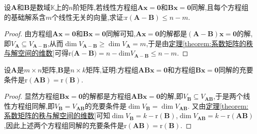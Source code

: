 \documentclass[../../main.tex]{subfiles}%
\begin{document}
\begin{example}
设\(\boldsymbol{A}\)和\(\boldsymbol{B}\)是数域\(\mathbb{K}\)上的\(n\)阶矩阵,若线性方程组\(\boldsymbol{A}\boldsymbol{x}=\boldsymbol{0}\)和\(\boldsymbol{B}\boldsymbol{x}=\boldsymbol{0}\)同解,且每个方程组的基础解系含\(m\)个线性无关的向量,求证:\(\mathrm{r}(\boldsymbol{A}-\boldsymbol{B})\leqslant  n - m\).
\end{example}
\begin{proof}

由方程组\(\boldsymbol{A}\boldsymbol{x}=\boldsymbol{0}\)和\(\boldsymbol{B}\boldsymbol{x}=\boldsymbol{0}\)同解可知,\(\boldsymbol{A}\boldsymbol{x}=\boldsymbol{0}\)的解都是\((\boldsymbol{A}-\boldsymbol{B})\boldsymbol{x}=\boldsymbol{0}\)的解,即\(V_{\boldsymbol{A}}\subseteq V_{\boldsymbol{A}-\boldsymbol{B}}\),从而\(\dim V_{\boldsymbol{A}-\boldsymbol{B}}\geqslant \dim V_{\boldsymbol{A}} = m\),于是由\hyperref[theorem:系数矩阵的秩与解空间的维数]{定理\ref{theorem:系数矩阵的秩与解空间的维数}}可得$\mathrm{r(}\boldsymbol{A}-\boldsymbol{B})=n-\mathrm{dim}V_{\boldsymbol{A}-\boldsymbol{B}}\leqslant n-m$.

\end{proof}

\begin{proposition}\label{proposition:ABx=O与Bx=O同解的充要条件}
设\(\boldsymbol{A}\)是\(m\times n\)矩阵,\(\boldsymbol{B}\)是\(n\times k\)矩阵,证明:方程组\(\boldsymbol{A}\boldsymbol{B}\boldsymbol{x}=\boldsymbol{0}\)和方程组\(\boldsymbol{B}\boldsymbol{x}=\boldsymbol{0}\)同解的充要条件是\(\mathrm{r}(\boldsymbol{A}\boldsymbol{B})=\mathrm{r}(\boldsymbol{B})\).
\end{proposition}
\begin{proof}

显然方程组\(\boldsymbol{B}\boldsymbol{x}=\boldsymbol{0}\)的解都是方程组\(\boldsymbol{A}\boldsymbol{B}\boldsymbol{x}=\boldsymbol{0}\)的解,即\(V_{\boldsymbol{B}}\subseteq V_{\boldsymbol{A}\boldsymbol{B}}\),于是两个线性方程组同解,即\(V_{\boldsymbol{B}} = V_{\boldsymbol{A}\boldsymbol{B}}\)的充要条件是\(\dim V_{\boldsymbol{B}}=\dim V_{\boldsymbol{A}\boldsymbol{B}}\). 又由\hyperref[theorem:系数矩阵的秩与解空间的维数]{定理\ref{theorem:系数矩阵的秩与解空间的维数}}可知\(\dim V_{\boldsymbol{B}}=k - \mathrm{r}(\boldsymbol{B})\),\(\dim V_{\boldsymbol{A}\boldsymbol{B}}=k - \mathrm{r}(\boldsymbol{A}\boldsymbol{B})\),因此上述两个方程组同解的充要条件是\(\mathrm{r}(\boldsymbol{A}\boldsymbol{B})=\mathrm{r}(\boldsymbol{B})\). 

\end{proof}
\end{document}
